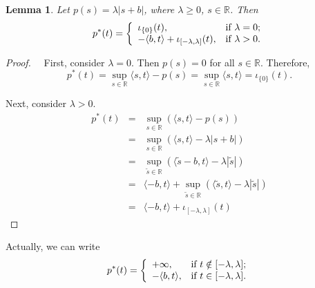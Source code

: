 \documentclass[preprint]{elsarticle}
\newtheorem{lemma}{Lemma}
\renewcommand{\ge}{\geqslant}
\renewcommand{\ge}{\geqslant}
\begin{document}
\begin{lemma}
Let $p(s)=\lambda|s+b|$, where $\lambda \ge 0$, $s \in \mathbb{R}$. Then
$$
p^*(t)=\left\{
         \begin{array}{ll}
           \iota_{\{0\}}(t), & \hbox{if $\lambda=0$;} \\
           -\langle b, t\rangle +\iota_{[-\lambda, \lambda]}(t), & \hbox{if $\lambda>0$.}
         \end{array}
       \right.
$$
\end{lemma}
\begin{proof}\ \ First, consider $\lambda=0$. Then $p(s)=0$ for all $s \in \mathbb{R}$. Therefore,
$$
p^*(t)=\sup_{s\in \mathbb{R}} \langle s, t\rangle - p(s) = \sup_{s\in \mathbb{R}} \langle s, t\rangle = \iota_{\{0\}}(t).
$$

Next, consider $\lambda>0$.
\begin{eqnarray*}
p^*(t)&=&\sup_{s\in \mathbb{R}} \left( \langle s, t\rangle - p(s)\right)\\
&=&\sup_{s\in \mathbb{R}}  \left( \langle s, t\rangle - \lambda|s+b|\right) \\
&=&\sup_{\widetilde{s}\in \mathbb{R}} \left(\langle \widetilde{s}-b, t\rangle - \lambda|\widetilde{s}|\right) \\
&=&\langle -b, t\rangle + \sup_{\widetilde{s}\in \mathbb{R}} \left(\langle \widetilde{s}, t\rangle - \lambda|\widetilde{s}|\right) \\
&=&\langle -b, t\rangle + \iota_{[-\lambda, \lambda]}(t)
\end{eqnarray*}
\end{proof}
Actually, we can write
$$
p^*(t)=\left\{
         \begin{array}{ll}
           +\infty, & \hbox{if $t \notin [-\lambda, \lambda]$;} \\
           -\langle b, t\rangle, & \hbox{if $t \in [-\lambda, \lambda]$.}
         \end{array}
       \right.
$$
\end{document}
